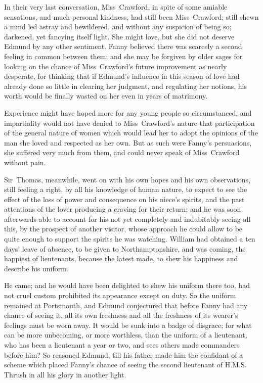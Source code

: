 In their very last conversation, Miss~Crawford, in spite of some amiable sensations, and much personal kindness, had still been Miss~Crawford; still shewn a mind led astray and bewildered, and without any suspicion of being so; darkened, yet fancying itself light. She might love, but she did not deserve Edmund by any other sentiment. Fanny believed there was scarcely a second feeling in common between them; and she may be forgiven by older sages for looking on the chance of Miss~Crawford's future improvement as nearly desperate, for thinking that if Edmund's influence in this season of love had already done so little in clearing her judgment, and regulating her notions, his worth would be finally wasted on her even in years of matrimony.

Experience might have hoped more for any young people so circumstanced, and impartiality would not have denied to Miss~Crawford's nature that participation of the general nature of women which would lead her to adopt the opinions of the man she loved and respected as her own. But as such were Fanny's persuasions, she suffered very much from them, and could never speak of Miss~Crawford without pain.

Sir~Thomas, meanwhile, went on with his own hopes and his own observations, still feeling a right, by all his knowledge of human nature, to expect to see the effect of the loss of power and consequence on his niece's spirits, and the past attentions of the lover producing a craving for their return; and he was soon afterwards able to account for his not yet completely and indubitably seeing all this, by the prospect of another visitor, whose approach he could allow to be quite enough to support the spirits he was watching. William had obtained a ten days' leave of absence, to be given to Northamptonshire, and was coming, the happiest of lieutenants, because the latest made, to shew his happiness and describe his uniform.

He came; and he would have been delighted to shew his uniform there too, had not cruel custom prohibited its appearance except on duty. So the uniform remained at Portsmouth, and Edmund conjectured that before Fanny had any chance of seeing it, all its own freshness and all the freshness of its wearer's feelings must be worn away. It would be sunk into a badge of disgrace; for what can be more unbecoming, or more worthless, than the uniform of a lieutenant, who has been a lieutenant a year or two, and sees others made commanders before him? So reasoned Edmund, till his father made him the confidant of a scheme which placed Fanny's chance of seeing the second lieutenant of H.M.S. Thrush in all his glory in another light.

